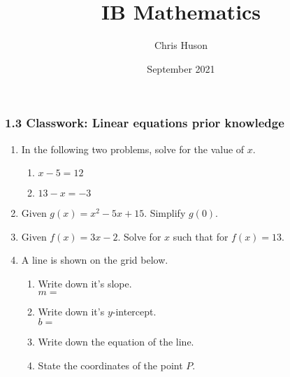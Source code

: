 \documentclass[12pt, twoside]{article}
\title{IB Mathematics}
\author{Chris Huson}
\date{September 2021}
\begin{document}
\subsubsection*{1.3 Classwork: Linear equations prior knowledge}
\begin{enumerate}
\item In the following two problems, solve for the value of $x$.
  \begin{multicols}{2}
    \begin{enumerate}
      \item   $x-5=12$ \vspace{6cm}
      \item   $13-x=-3$ \vspace{6cm}
    \end{enumerate}
  \end{multicols}
    \vspace{2.5cm}

\item Given $g(x)=x^2-5x+15$. Simplify $g(0)$. \vspace{3cm}
\item Given $f(x)=3x-2$. Solve for $x$ such that for $f(x)=13$. \vspace{4cm}  

\item A line is shown on the grid below.
\begin{multicols}{2}
\begin{enumerate}
  \item Write down it's slope.\\ $m=$
  \vspace{0.25cm}
  \item Write down it's $y$-intercept.\\ $b=$
  \vspace{0.25cm}
  \item Write down the equation of the line.
  \vspace{1cm}
  \item State the coordinates of the point $P$.
\end{enumerate}
  \begin{center} %
  \end{center}
\end{multicols}


\end{enumerate}
\end{document}
